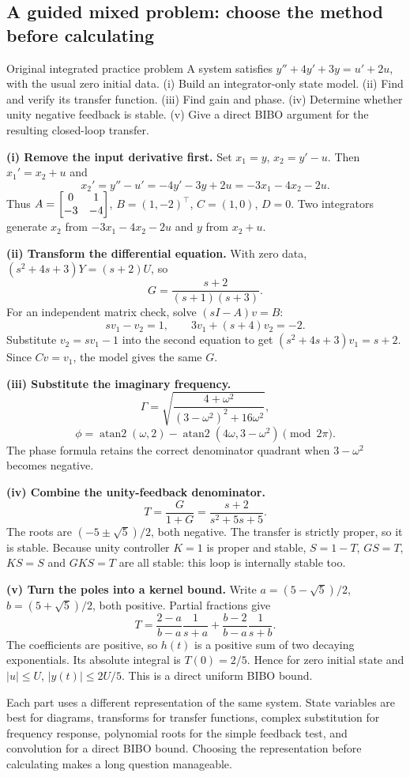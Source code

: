 \subsection{A guided mixed problem: choose the method before calculating}
\begin{question}{Original integrated practice problem}
A system satisfies $y''+4y'+3y=u'+2u$, with the usual zero initial data. (i) Build an integrator-only state model. (ii) Find and verify its transfer function. (iii) Find gain and phase. (iv) Determine whether unity negative feedback is stable. (v) Give a direct BIBO argument for the resulting closed-loop transfer.
\end{question}
\begin{answer}
\textbf{(i) Remove the input derivative first.} Set $x_1=y$, $x_2=y'-u$. Then $x_1'=x_2+u$ and
\[x_2'=y''-u'=-4y'-3y+2u=-3x_1-4x_2-2u.\]
Thus $A=\begin{bmatrix}0&1\\-3&-4\end{bmatrix}$, $B=(1,-2)^{\top}$, $C=(1,0)$, $D=0$. Two integrators generate $x_2$ from $-3x_1-4x_2-2u$ and $y$ from $x_2+u$.

\textbf{(ii) Transform the differential equation.} With zero data, $(s^2+4s+3)Y=(s+2)U$, so
\[G=\frac{s+2}{(s+1)(s+3)}.\]
For an independent matrix check, solve $(sI-A)v=B$:
\[sv_1-v_2=1,\qquad3v_1+(s+4)v_2=-2.\]
Substitute $v_2=sv_1-1$ into the second equation to get $(s^2+4s+3)v_1=s+2$. Since $Cv=v_1$, the model gives the same $G$.

\textbf{(iii) Substitute the imaginary frequency.}
\[\Gamma=\sqrt{\frac{4+\omega^2}{(3-\omega^2)^2+16\omega^2}},\]
\[\phi=\operatorname{atan2}(\omega,2)-\operatorname{atan2}(4\omega,3-\omega^2)\pmod{2\pi}.\]
The phase formula retains the correct denominator quadrant when $3-\omega^2$ becomes negative.

\textbf{(iv) Combine the unity-feedback denominator.}
\[T=\frac G{1+G}=\frac{s+2}{s^2+5s+5}.\]
The roots are $(-5\pm\sqrt5)/2$, both negative. The transfer is strictly proper, so it is stable. Because unity controller $K=1$ is proper and stable, $S=1-T$, $GS=T$, $KS=S$ and $GKS=T$ are all stable: this loop is internally stable too.

\textbf{(v) Turn the poles into a kernel bound.} Write $a=(5-\sqrt5)/2$, $b=(5+\sqrt5)/2$, both positive. Partial fractions give
\[T=\frac{2-a}{b-a}\frac1{s+a}+\frac{b-2}{b-a}\frac1{s+b}.\]
The coefficients are positive, so $h(t)$ is a positive sum of two decaying exponentials. Its absolute integral is $T(0)=2/5$. Hence for zero initial state and $|u|\leq U$, $|y(t)|\leq2U/5$. This is a direct uniform BIBO bound.
\end{answer}
\begin{tip}
Each part uses a different representation of the same system. State variables are best for diagrams, transforms for transfer functions, complex substitution for frequency response, polynomial roots for the simple feedback test, and convolution for a direct BIBO bound. Choosing the representation before calculating makes a long question manageable.
\end{tip}

